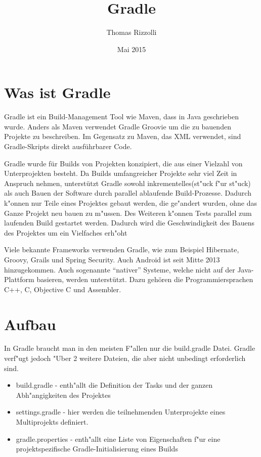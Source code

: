 \documentclass[a4paper]{article}
\title{Gradle}
\author{Thomas Rizzolli}
\date{Mai 2015}
\begin{document}
\maketitle

\section{Was ist Gradle}
Gradle ist ein Build-Management Tool wie Maven, dass in Java geschrieben wurde. Anders als Maven verwendet Gradle Groovie um die zu bauenden Projekte zu beschreiben. Im Gegensatz zu Maven, das XML verwendet, sind Gradle-Skripts direkt ausführbarer Code.

Gradle wurde für Builds von Projekten konzipiert, die aus einer Vielzahl von Unterprojekten besteht.
Da Builds umfangreicher Projekte sehr viel Zeit in Anspruch nehmen, unterstützt Gradle sowohl inkrementelles(st"uck f"ur st"uck) als auch Bauen der Software durch parallel ablaufende Build-Prozesse. Dadurch k"onnen nur Teile eines Projektes gebaut werden, die ge"andert wurden, ohne das Ganze Projekt neu bauen zu m"ussen. Des Weiteren k"onnen Tests parallel zum laufenden Build gestartet werden. Dadurch wird die Geschwindigkeit des Bauens des Projektes um ein Vielfaches erh"oht

Viele bekannte Frameworks verwenden Gradle, wie zum Beispiel Hibernate, Groovy, Grails und Spring Security. Auch Android ist seit Mitte 2013 hinzugekommen. Auch sogenannte ``nativer'' Systeme, welche nicht auf der Java-Plattform basieren, werden unterstützt. Dazu gehören die Programmiersprachen C++, C, Objective C und Assembler.

\section{Aufbau}
In Gradle braucht man in den meisten F"allen nur die build.gradle Datei. Gradle verf"ugt jedoch "Uber 2 weitere Dateien, die aber nicht unbedingt erforderlich sind.
\begin{itemize}
\item build.gradle - enth"allt die Definition der Tasks und der ganzen Abh"angigkeiten des Projektes
\item settings.gradle - hier werden die teilnehmenden Unterprojekte eines Multiprojekts definiert.
\item gradle.properties - enth"allt eine Liste von Eigenschaften f"ur eine projektspezifische Gradle-Initialisierung eines Builds
\end{itemize}
\end{document}
